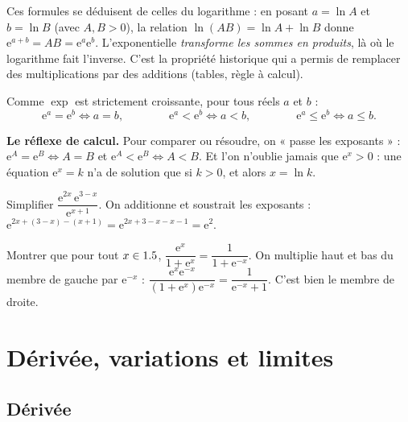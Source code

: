 \begin{remarque}
Ces formules se déduisent de celles du logarithme : en posant $a=\ln A$ et $b=\ln B$
(avec $A,B>0$), la relation $\ln(AB)=\ln A+\ln B$ donne
$\mathrm{e}^{a+b}=AB=\mathrm{e}^{a}\mathrm{e}^{b}$. L'exponentielle \emph{transforme les sommes
en produits}, là où le logarithme fait l'inverse. C'est la propriété historique qui a permis
de remplacer des multiplications par des additions (tables, règle à calcul).
\end{remarque}

\begin{propriete}
Comme $\exp$ est strictement croissante, pour tous réels $a$ et $b$ :
\[
\mathrm{e}^{a}=\mathrm{e}^{b}\iff a=b,\qquad\qquad
\mathrm{e}^{a}<\mathrm{e}^{b}\iff a<b,\qquad\qquad
\mathrm{e}^{a}\le\mathrm{e}^{b}\iff a\le b.
\]
\end{propriete}

\begin{aretenir}
\textbf{Le réflexe de calcul.} Pour comparer ou résoudre, on « passe les exposants » :
$\mathrm{e}^{A}=\mathrm{e}^{B}\iff A=B$ et $\mathrm{e}^{A}<\mathrm{e}^{B}\iff A<B$.
Et l'on n'oublie jamais que $\mathrm{e}^{x}>0$ : une équation $\mathrm{e}^{x}=k$ n'a de solution
que si $k>0$, et alors $x=\ln k$.
\end{aretenir}

\begin{exemple}
Simplifier $\dfrac{\mathrm{e}^{2x}\,\mathrm{e}^{3-x}}{\mathrm{e}^{x+1}}$. On additionne et
soustrait les exposants : $\mathrm{e}^{2x+(3-x)-(x+1)}=\mathrm{e}^{2x+3-x-x-1}=\mathrm{e}^{2}$.
\end{exemple}

\begin{exemple}
Montrer que pour tout $x\in1.5$, $\dfrac{\mathrm{e}^{x}}{1+\mathrm{e}^{x}}=\dfrac{1}{1+\mathrm{e}^{-x}}$.
On multiplie haut et bas du membre de gauche par $\mathrm{e}^{-x}$ :
$\dfrac{\mathrm{e}^{x}\mathrm{e}^{-x}}{(1+\mathrm{e}^{x})\mathrm{e}^{-x}}
=\dfrac{1}{\mathrm{e}^{-x}+1}$. C'est bien le membre de droite.
\end{exemple}

\section{Dérivée, variations et limites}

\subsection*{Dérivée}

